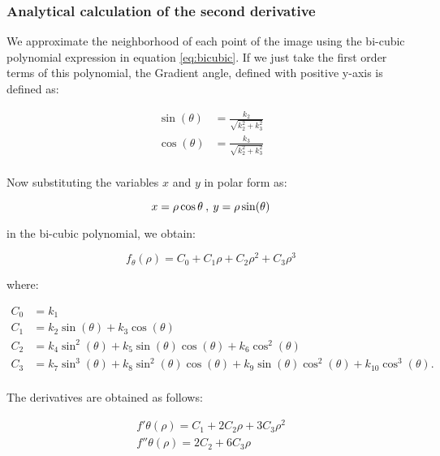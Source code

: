\documentclass{ipol}
\numberwithin{equation}{section}
\numberwithin{table}{section}
\numberwithin{figure}{section}
\begin{document}
\subsubsection{Analytical calculation of the second derivative}
\label{sec:secderivative}

We approximate the neighborhood of each point of the image using the bi-cubic polynomial 
expression in equation \ref{eq:bicubic}. If we just take the first order terms of this 
polynomial, the Gradient angle, defined with positive y-axis is defined as:

\begin{align}
\label{eq:sincos}
	\sin(\theta) & = \frac{k_2}{\sqrt{k_2^2 + k_3^2}} \nonumber \\
	\cos(\theta) & = \frac{k_3}{\sqrt{k_2^2 + k_3^2}} \nonumber \\
\end{align}

Now substituting the variables $x$ and $y$ in polar form as:

\begin{equation*}
	x = \rho\cos{\theta} \: , \: y = \rho\sin(\theta) \\
\end{equation*}

in the bi-cubic polynomial, we obtain:

\begin{equation}
	f_{\theta}(\rho) = C_0 + C_1\rho + C_2\rho^2 + C_3\rho^3
\end{equation}

where:

\begin{align}
\label{eq:c}
	C_0 & = k_1 \nonumber \nonumber \\
	C_1 & = k_2\sin(\theta) + k_3\cos(\theta) \nonumber \\
	C_2 & = k_4\sin^2(\theta) + k_5\sin(\theta)\cos(\theta) + k_6\cos^2(\theta) \nonumber \\
	C_3 & = k_7\sin^3(\theta) + k_8\sin^2(\theta)\cos(\theta) + k_9\sin(\theta)\cos^2(\theta) + k_{10}\cos^3(\theta). \nonumber \\
\end{align}

The derivatives are obtained as follows:

\begin{align}
	f'{\theta}(\rho) = C_1 + 2C_2\rho + 3C_3\rho^2 \nonumber \\
	f''{\theta}(\rho) = 2C_2 + 6C_3\rho \nonumber \\
\end{align}
\end{document}
